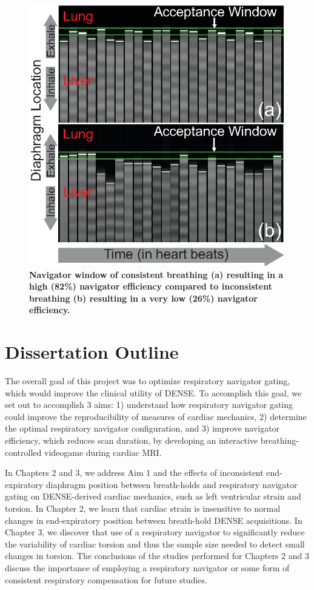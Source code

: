 	\begin{figure}
		\centering
		\includegraphics{figures/intro/goodvsbadbreathingpatterns}
		\caption[Consistent vs Inconsistent Breathing]{\textbf{Navigator window of consistent breathing (a) resulting in a high (82\%) navigator efficiency compared to inconsistent breathing (b) resulting in a very low (26\%) navigator efficiency.}}
		\label{fig:good_vs_bad_breathing}
	\end{figure}

\section{Dissertation Outline}
	The overall goal of this project was to optimize respiratory navigator gating, which would improve the clinical utility of DENSE. To accomplish this goal, we set out to accomplish 3 aims: 1) understand how respiratory navigator gating could improve the reproducibility of measures of cardiac mechanics, 2) determine the optimal respiratory navigator configuration, and 3) improve navigator efficiency, which reduces scan duration, by developing an interactive breathing-controlled videogame during cardiac MRI.
	
	\indent In Chapters 2 and 3, we address Aim 1 and the effects of inconsistent end-expiratory diaphragm position between breath-holds and respiratory navigator gating on DENSE-derived cardiac mechanics, such as left ventricular strain and torsion. In Chapter 2, we learn that cardiac strain is insensitive to normal changes in end-expiratory position between breath-hold DENSE acquisitions. In Chapter 3, we discover that use of a respiratory navigator to significantly reduce the variability of cardiac torsion and thus the sample size needed to detect small changes in torsion. The conclusions of the studies performed for Chapters 2 and 3 discuss the importance of employing a respiratory navigator or some form of consistent respiratory compensation for future studies.
	
